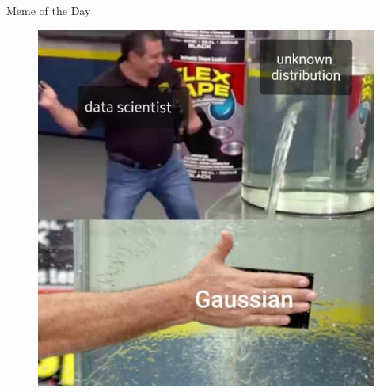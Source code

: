 \begin{frame}{Meme of the Day}{}
	\begin{figure}
		\includegraphics[scale=0.90]{04_density_estimation/02_img/gaussianseverywhere}
	\end{figure}
\end{frame}


\makethanks

